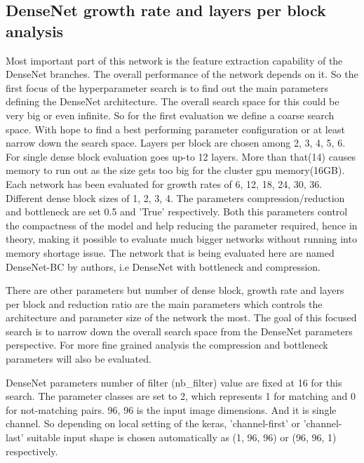 \subsection{DenseNet growth rate and layers per block analysis}
 Most important part of this network is the feature extraction capability of the DenseNet branches. The overall performance of the network depends on it. So the first focus of the hyperparameter search is to find out the 
 main parameters defining the DenseNet architecture. The overall search space for this could be very big or even infinite. So for the first evaluation we define a coarse search space. With hope to find a best performing 
 parameter configuration or at least narrow down the search space.
 Layers per block are chosen among 2, 3, 4, 5, 6. For single dense block evaluation goes up-to 12 layers. More than that(14) causes memory to run out as the size gets too big 
 for the cluster gpu memory(16GB). Each network has been evaluated for growth rates of 6, 12, 18, 24, 30, 36. Different dense block sizes of 1, 2, 3, 4. The parameters compression/reduction and bottleneck are set 0.5 and 'True' respectively.
 Both this parameters control the compactness of the model and help reducing the parameter required, hence in theory, making it possible to evaluate much bigger networks without running into memory shortage issue. 
 The network that is being evaluated here are named DenseNet-BC by authors, i.e DenseNet with bottleneck and compression. 
 
 There are other parameters but number of dense block, growth rate and layers per block and reduction ratio are the main parameters which controls the architecture and parameter size of the network the most.
 The goal of this focused search is to narrow down the overall search space from the DenseNet parameters perspective. For more fine grained analysis the compression and bottleneck parameters will also be evaluated. 
 
 DenseNet parameters number of filter (nb\_filter) value are fixed at 16 for this search. The parameter classes are set to 2, which represents 1 for matching and 0 for not-matching pairs. 96, 96 is the input image dimensions. 
 And it is single channel. So depending on local setting of the keras, 'channel-first' or 'channel-last' suitable input shape is chosen automatically as  (1, 96, 96)  or (96, 96, 1) respectively.
 
